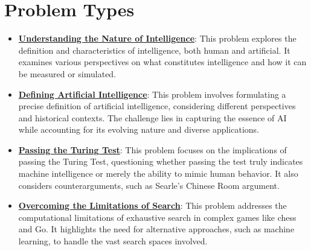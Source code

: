 \documentclass{article}%
\begin{document}
\section{Problem Types}%
\label{sec:ProblemTypes}%
\begin{itemize}[leftmargin=*]%
\item \href{https://purdue.brightspace.com/d2l/common/assets/pdfjs-d2l-dist/1.0.14-legacy/web/viewer.html?file=%2Fcontent%2Fenforced%2F1095467-wl.202510.CS.24300.001%2F02L2-Intro.pdf%3Fou%3D1095467&lang=en-us&container=d2l-fileviewer-rendered-pdf&fullscreen=d2l-fileviewer-rendered-pdf-dialog&height=667#page=5}{\textbf{Understanding the Nature of Intelligence}}: This problem explores the definition and characteristics of intelligence, both human and artificial. It examines various perspectives on what constitutes intelligence and how it can be measured or simulated.%
\item \href{https://purdue.brightspace.com/d2l/common/assets/pdfjs-d2l-dist/1.0.14-legacy/web/viewer.html?file=%2Fcontent%2Fenforced%2F1095467-wl.202510.CS.24300.001%2F02L2-Intro.pdf%3Fou%3D1095467&lang=en-us&container=d2l-fileviewer-rendered-pdf&fullscreen=d2l-fileviewer-rendered-pdf-dialog&height=667#page=5}{\textbf{Defining Artificial Intelligence}}: This problem involves formulating a precise definition of artificial intelligence, considering different perspectives and historical contexts. The challenge lies in capturing the essence of AI while accounting for its evolving nature and diverse applications.%
\item \href{https://purdue.brightspace.com/d2l/common/assets/pdfjs-d2l-dist/1.0.14-legacy/web/viewer.html?file=%2Fcontent%2Fenforced%2F1095467-wl.202510.CS.24300.001%2F02L2-Intro.pdf%3Fou%3D1095467&lang=en-us&container=d2l-fileviewer-rendered-pdf&fullscreen=d2l-fileviewer-rendered-pdf-dialog&height=667#page=6}{\textbf{Passing the Turing Test}}: This problem focuses on the implications of passing the Turing Test, questioning whether passing the test truly indicates machine intelligence or merely the ability to mimic human behavior. It also considers counterarguments, such as Searle's Chinese Room argument.%
\item \href{https://purdue.brightspace.com/d2l/common/assets/pdfjs-d2l-dist/1.0.14-legacy/web/viewer.html?file=%2Fcontent%2Fenforced%2F1095467-wl.202510.CS.24300.001%2F02L2-Intro.pdf%3Fou%3D1095467&lang=en-us&container=d2l-fileviewer-rendered-pdf&fullscreen=d2l-fileviewer-rendered-pdf-dialog&height=667#page=11}{\textbf{Overcoming the Limitations of Search}}: This problem addresses the computational limitations of exhaustive search in complex games like chess and Go. It highlights the need for alternative approaches, such as machine learning, to handle the vast search spaces involved.%

\end{itemize}
\end{document}
